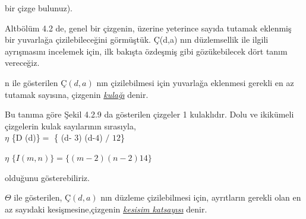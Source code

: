 \documentclass[13pt]{amsbook}
\begin{document}

\par
    bir çizge bulunuz). 
\par
    Altbölüm 4.2 de, genel bir çizgenin, üzerine yeterince sayıda 			tutamak eklenmiş bir yuvarlağa çizilebileceğini görmüştük. Ç(d,a) 		nın düzlemsellik ile ilgili ayrışmasını incelemek için, ilk 			bakışta özdeşmiş gibi gözükebilecek dört tanım vereceğiz. 

\begin{definition}
    \begin{minipage}{.75\linewidth}
        \begin{flushleft}                                 
         	\vspace{15pt}n ile gösterilen $Ç(d,a)$ nın çizilebilmesi için 						yuvarlağa eklenmesi gerekli en az tutamak sayısına, 					çizgenin \emph{\underline{kulağı}} denir.
        \end{flushleft} 
    \end{minipage}
\end{definition}

\par
    Bu tanıma göre Şekil 4.2.9 da gösterilen çizgeler 1 kulaklıdır. 		Dolu ve ikikümeli çizgelerin kulak sayılarının sırasıyla,\\

\hspace{2cm}$\eta$  \{D (d)\}$=$ \{ (d- $3$) (d-$4$) $/$ $12$\}

\hspace{2cm}$\eta$  $\{I (m, n) \} = \{ (m- 2) (n - 2) 1 4 \}$ 

\par
    olduğunu gösterebiliriz.
    
\begin{definition}
    \begin{minipage}{.60\linewidth}
        \begin{flushleft}                                       
          \vspace{15pt}$\Theta$ ile gösterilen, $Ç(d,a)$ nın düzleme çizilebilmesi 	için, ayrıtların gerekli olan en az sayıdaki 				kesişmesine,çizgenin \emph{\underline{kesisim katsayısı}}  denir.
        \end{flushleft} 
    \end{minipage}
\end{definition}



 
\end{document}
